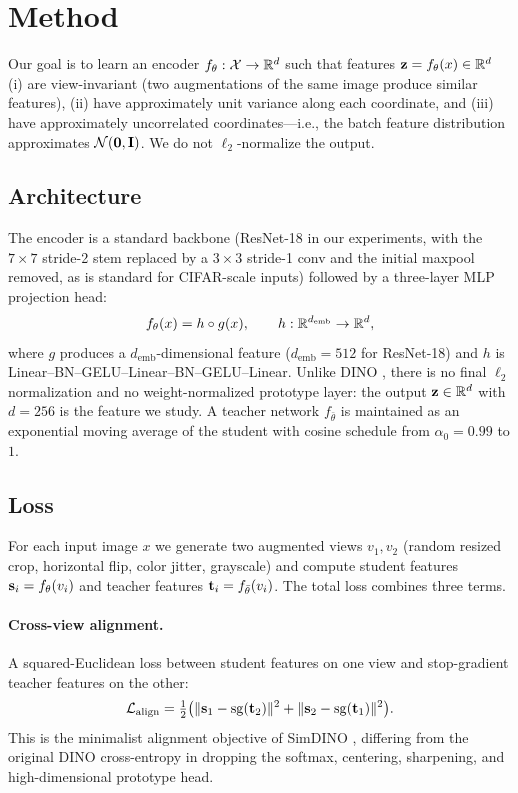 \section{Method}
\label{sec:method}

Our goal is to learn an encoder $f_\theta : \mathcal{X} \to \mathbb{R}^d$ such that features $\mathbf{z} = f_\theta(x) \in \mathbb{R}^d$ (i) are view-invariant (two augmentations of the same image produce similar features), (ii) have approximately unit variance along each coordinate, and (iii) have approximately uncorrelated coordinates---i.e., the batch feature distribution approximates $\mathcal{N}(\mathbf{0}, \mathbf{I})$. We do not $\ell_2$-normalize the output.

\subsection{Architecture}

The encoder is a standard backbone (ResNet-18 \citep{he2016resnet} in our experiments, with the $7\times 7$ stride-2 stem replaced by a $3\times 3$ stride-1 conv and the initial maxpool removed, as is standard for CIFAR-scale inputs) followed by a three-layer MLP projection head:
\begin{equation}
    f_\theta(x) = h \circ g(x), \qquad h : \mathbb{R}^{d_\text{emb}} \to \mathbb{R}^d,
\end{equation}
where $g$ produces a $d_\text{emb}$-dimensional feature ($d_\text{emb} = 512$ for ResNet-18) and $h$ is Linear--BN--GELU--Linear--BN--GELU--Linear. Unlike DINO \citep{caron2021emerging}, there is no final $\ell_2$ normalization and no weight-normalized prototype layer: the output $\mathbf{z} \in \mathbb{R}^d$ with $d = 256$ is the feature we study. A teacher network $f_{\bar{\theta}}$ is maintained as an exponential moving average of the student with cosine schedule from $\alpha_0 = 0.99$ to $1$.

\subsection{Loss}

For each input image $x$ we generate two augmented views $v_1, v_2$ (random resized crop, horizontal flip, color jitter, grayscale) and compute student features $\mathbf{s}_i = f_\theta(v_i)$ and teacher features $\mathbf{t}_i = f_{\bar\theta}(v_i)$. The total loss combines three terms.

\paragraph{Cross-view alignment.} A squared-Euclidean loss between student features on one view and stop-gradient teacher features on the other:
\begin{equation}
    \mathcal{L}_\text{align} = \tfrac{1}{2}\bigl(\|\mathbf{s}_1 - \operatorname{sg}(\mathbf{t}_2)\|^2 + \|\mathbf{s}_2 - \operatorname{sg}(\mathbf{t}_1)\|^2\bigr).
\end{equation}
This is the minimalist alignment objective of SimDINO \citep{wu2025simdino}, differing from the original DINO cross-entropy in dropping the softmax, centering, sharpening, and high-dimensional prototype head.

